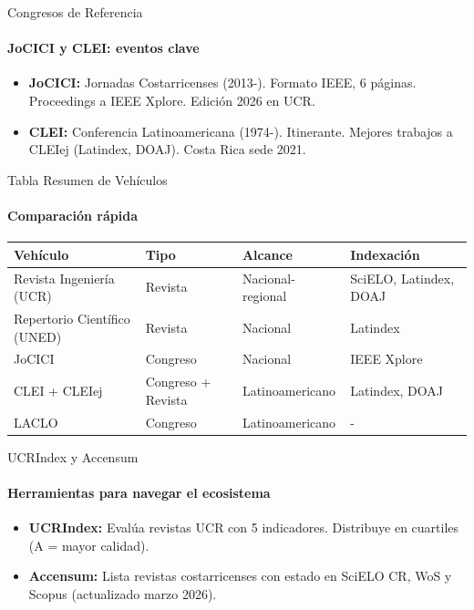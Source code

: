\documentclass[aspectratio=169, 12pt]{beamer}
\begin{document}
\begin{frame}{Congresos de Referencia}
  \framesubtitle{JoCICI y CLEI: eventos clave}
  \vspace{-2pt}

  \begin{itemize}
    \item {\bfseries JoCICI:} Jornadas Costarricenses (2013-). Formato IEEE, 6 páginas. Proceedings a IEEE Xplore. Edición 2026 en UCR.
    \item {\bfseries CLEI:} Conferencia Latinoamericana (1974-). Itinerante. Mejores trabajos a CLEIej (Latindex, DOAJ). Costa Rica sede 2021.
  \end{itemize}
\end{frame}

\begin{frame}{Tabla Resumen de Vehículos}
  \framesubtitle{Comparación rápida}
  \vspace{-2pt}

  \begin{tabular}{|l|l|l|l|}
    \hline
    Vehículo & Tipo & Alcance & Indexación \\
    \hline
    Revista Ingeniería (UCR) & Revista & Nacional-regional & SciELO, Latindex, DOAJ \\
    Repertorio Científico (UNED) & Revista & Nacional & Latindex \\
    JoCICI & Congreso & Nacional & IEEE Xplore \\
    CLEI + CLEIej & Congreso + Revista & Latinoamericano & Latindex, DOAJ \\
    LACLO & Congreso & Latinoamericano & - \\
    \hline
  \end{tabular}
\end{frame}

\begin{frame}{UCRIndex y Accensum}
  \framesubtitle{Herramientas para navegar el ecosistema}
  \vspace{-2pt}

  \begin{itemize}
    \item {\bfseries UCRIndex:} Evalúa revistas UCR con 5 indicadores. Distribuye en cuartiles (A = mayor calidad).
    \item {\bfseries Accensum:} Lista revistas costarricenses con estado en SciELO CR, WoS y Scopus (actualizado marzo 2026).
  \end{itemize}
\end{frame}
\end{document}
